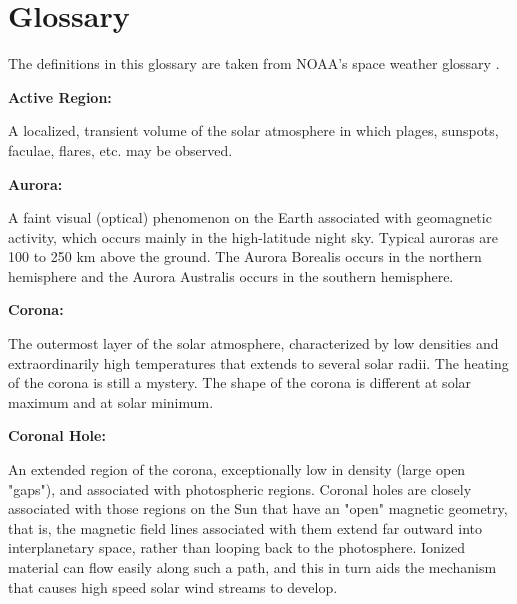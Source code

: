 \chapter{Glossary}
\label{appendiceA}
\thispagestyle{empty}

The definitions in this glossary are taken from NOAA's space weather glossary \cite{NOAAglossary}.\\


\newenvironment{myindentpar}[1]%
{\begin{list}{}%
        {\setlength{\leftmargin}{#1}}%
        \item[]%
}
{\end{list}}


\textbf{Active Region:}
\begin{myindentpar}{1cm}
  A localized, transient volume of the solar atmosphere in which plages, sunspots, faculae, flares, etc. may be observed.
\end{myindentpar}

\textbf{Aurora:}
\begin{myindentpar}{1cm}
A faint visual (optical) phenomenon on the Earth associated with geomagnetic activity, which occurs mainly in the high-latitude night sky. Typical auroras are 100 to 250 km above the ground. The Aurora Borealis occurs in the northern hemisphere and the Aurora Australis occurs in the southern hemisphere.
\end{myindentpar}

\textbf{Corona:}
\begin{myindentpar}{1cm}
  The outermost layer of the solar atmosphere, characterized by low densities and extraordinarily high temperatures that extends to several solar radii. The heating of the corona is still a mystery. The shape of the corona is different at solar maximum and at solar minimum.
\end{myindentpar}

\textbf{Coronal Hole:}
\begin{myindentpar}{1cm}
  An extended region of the corona, exceptionally low in density (large open "gaps"), and associated with photospheric regions. Coronal holes are closely associated with those regions on the Sun that have an "open" magnetic geometry, that is, the magnetic field lines associated with them extend far outward into interplanetary space, rather than looping back to the photosphere. Ionized material can flow easily along such a path, and this in turn aids the mechanism that causes high speed solar wind streams to develop.
\end{myindentpar}

